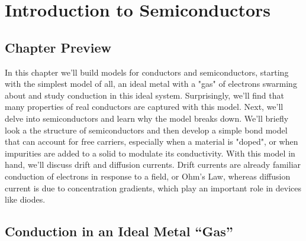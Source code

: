 \chapter{Introduction to Semiconductors}
\label{ch:ch03_semi}
\graphicspath{{./figs_semi/}}
\section{Chapter Preview}
In this chapter we'll build models for conductors and semiconductors, starting with the simplest model of all, an ideal metal with a "gas" of electrons swarming about and study conduction in this ideal system.  Surprisingly, we'll find that many properties of real conductors are captured with this model.  Next, we'll delve into semiconductors and learn why the model breaks down.  We'll briefly look a the structure of semiconductors and then develop a simple bond model that can account for free carriers, especially when a material is "doped", or when impurities are added to a solid to modulate its conductivity.  With this model in hand, we'll discuss drift and diffusion currents.  Drift currents are already familiar conduction of electrons in response to a field, or Ohm's Law, whereas diffusion current is due to concentration gradients, which play an important role in devices like diodes. 
\section{Conduction in an Ideal Metal ``Gas''}
